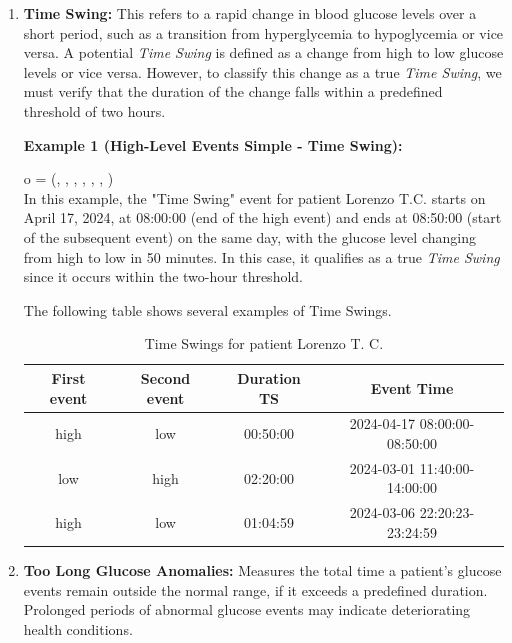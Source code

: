 \documentclass{article}
\begin{document}
\begin{enumerate}
    \item \textbf{Time Swing:} This refers to a rapid change in blood glucose levels over a short period, such as a transition from hyperglycemia to hypoglycemia or vice versa. A potential \textit{Time Swing} is defined as a change from high to low glucose levels or vice versa. However, to classify this change as a true \textit{Time Swing}, we must verify that the duration of the change falls within a predefined threshold of two hours.
    
    \textbf{Example 1 (High-Level Events Simple - Time Swing):}
    
    o = (, , , , , , )\\
    
    
    In this example, the "Time Swing" event for patient Lorenzo T.C. starts on April 17, 2024, at 08:00:00 (end of the high event) and ends at 08:50:00 (start of the subsequent event) on the same day, with the glucose level changing from high to low in 50 minutes. In this case, it qualifies as a true \textit{Time Swing} since it occurs within the two-hour threshold.
    
    The following table shows several examples of Time Swings.

    \pagebreak
    
    \begin{table}[h!]
        \centering
        \begin{tabular}{|c|c|c|c|}
            \hline
            \textbf{First event} & \textbf{Second event} & \textbf{Duration TS}  & \textbf{Event Time}\\
            \hline
            high & low & 00:50:00 & 2024-04-17 08:00:00-08:50:00 \\
            \hline
            low & high &  02:20:00 & 2024-03-01 11:40:00-14:00:00 \\
            \hline
            high & low & 01:04:59 & 2024-03-06 22:20:23-23:24:59 \\
            \hline
    
        \end{tabular}
        \caption{Time Swings for patient Lorenzo T. C.}
        \label{tab:time_swing}
    \end{table}

  \item \textbf{Too Long Glucose Anomalies:} Measures the total time a patient's glucose events remain outside the normal range, if it exceeds a predefined duration. Prolonged periods of abnormal glucose events may indicate deteriorating health conditions.
    

\end{enumerate}
\end{document}
